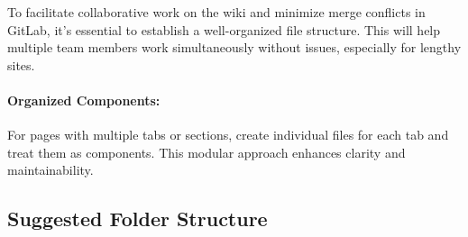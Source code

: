 
 
\noindent To facilitate collaborative work on the wiki and minimize merge conflicts in GitLab, it's essential to establish a well-organized file structure. 
This will help multiple team members work simultaneously without issues, especially for lengthy sites.

\paragraph{Organized Components:} For pages with multiple tabs or sections, create individual files for each tab and treat them as components. 
This modular approach enhances clarity and maintainability.

\subsection*{Suggested Folder Structure} \label{subsec:folderstructure} 
